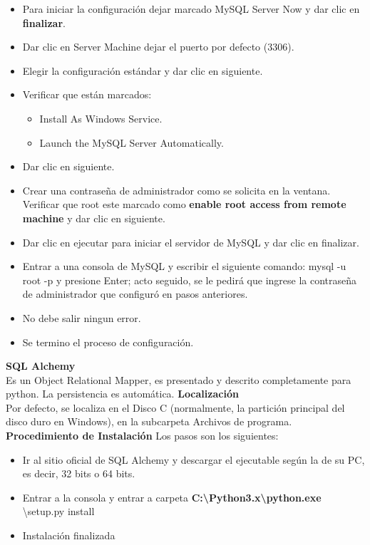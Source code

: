 \begin{itemize}
   \item Para iniciar la configuración dejar marcado MySQL 
   Server Now y dar clic en \textbf{finalizar}.
   \item Dar clic en Server Machine dejar el puerto por defecto (3306).
   \item Elegir la configuración estándar y dar clic en siguiente.
   \item Verificar que están marcados:
   \begin{itemize}
       \item Install As Windows Service.
       \item Launch the MySQL Server Automatically.
   \end{itemize}
    \item Dar clic en siguiente.
    \item Crear una contraseña de administrador como se solicita en la ventana.
    Verificar que root este marcado como \textbf{enable root access from remote 
    machine} y dar clic en siguiente.
    \item Dar clic en ejecutar para iniciar el servidor de MySQL y dar clic en finalizar.
    \item Entrar a una consola de MySQL y escribir el siguiente comando: mysql -u root -p
    y presione Enter; acto seguido, se le pedirá que ingrese la contraseña de administrador
    que configuró en pasos anteriores.
    \item No debe salir ningun error.
    \item Se termino el proceso de configuración.
\end{itemize}
\textbf{SQL Alchemy}
\\
Es un Object Relational Mapper, es presentado y descrito completamente para python. La 
persistencia es automática.
\textbf{Localización}
\\
Por defecto, se localiza en el Disco C (normalmente, la partición principal del 
disco duro en Windows), en la subcarpeta Archivos de programa.
\\
\textbf{Procedimiento de Instalación}
Los pasos son los siguientes:
\begin{itemize}
    \item Ir al sitio oficial de SQL Alchemy y descargar el ejecutable según la 
    de su PC, es decir, 32 bits o 64 bits.
    \item Entrar a la consola y entrar a carpeta \textbf{C:\textbackslash{Python3.x}\textbackslash{python.exe}}
    \textbackslash{setup.py} install
    \item Instalación finalizada
\end{itemize}
